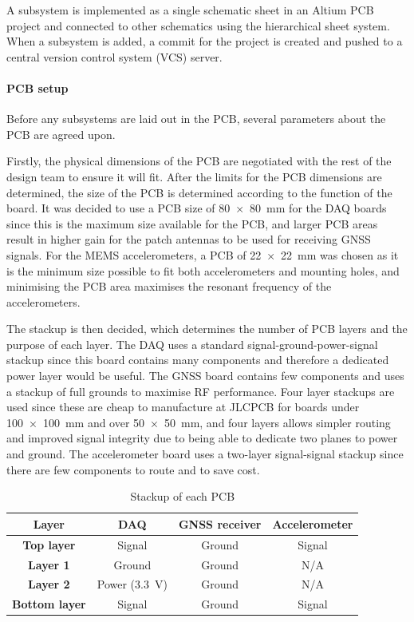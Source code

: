 \documentclass[a4paper,11pt]{article}
\begin{document}
A subsystem is implemented as a single schematic sheet in an Altium PCB project and connected to other schematics using the hierarchical sheet system. When a subsystem is added, a commit for the project is created and pushed to a central version control system (VCS) server.

\paragraph{PCB setup}

Before any subsystems are laid out in the PCB, several parameters about the PCB are agreed upon.

Firstly, the physical dimensions of the PCB are negotiated with the rest of the design team to ensure it will fit. After the limits for the PCB dimensions are determined, the size of the PCB is determined according to the function of the board. It was decided to use a PCB size of \SI{80 x 80}{\milli\metre} for the DAQ boards since this is the maximum size available for the PCB, and larger PCB areas result in higher gain for the patch antennas to be used for receiving GNSS signals. For the MEMS accelerometers, a PCB of \SI{22 x 22}{\milli\metre} was chosen as it is the minimum size possible to fit both accelerometers and mounting holes, and minimising the PCB area maximises the resonant frequency of the accelerometers.

The stackup is then decided, which determines the number of PCB layers and the purpose of each layer. The DAQ uses a standard signal-ground-power-signal stackup since this board contains many components and therefore a dedicated power layer would be useful. The GNSS board contains few components and uses a stackup of full grounds to maximise RF performance. Four layer stackups are used since these are cheap to manufacture at JLCPCB for boards under \SI{100x100}{\milli\meter} and over \SI{50x50}{\milli\metre}, and four layers allows simpler routing and improved signal integrity due to being able to dedicate two planes to power and ground. The accelerometer board uses a two-layer signal-signal stackup since there are few components to route and to save cost.

\begin{table}[H]
  \centering
  \begin{tabular}{|c|c|c|c|}
    \hline
    \textbf{Layer}        & \textbf{DAQ}            & \textbf{GNSS receiver} & \textbf{Accelerometer} \\
    \hline
    \textbf{Top layer}    & Signal                  & Ground                 & Signal                 \\
    \textbf{Layer 1}      & Ground                  & Ground                 & N/A                    \\
    \textbf{Layer 2}      & Power (\SI{3.3}{\volt}) & Ground                 & N/A                    \\
    \textbf{Bottom layer} & Signal                  & Ground                 & Signal                 \\
    \hline
  \end{tabular}
  \caption{Stackup of each PCB}
  \label{tabl:stackups}
\end{table}
\end{document}
